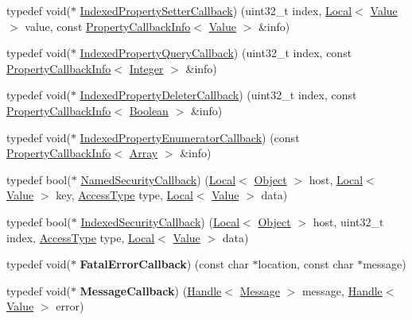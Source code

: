 \begin{DoxyCompactItemize}
\item 
typedef void($\ast$ \hyperlink{namespacev8_a4ac7cc6185ebc8b6a199f9fa8e6bf5c3}{Indexed\+Property\+Setter\+Callback}) (uint32\+\_\+t index, \hyperlink{classv8_1_1Local}{Local}$<$ \hyperlink{classv8_1_1Value}{Value} $>$ value, const \hyperlink{classv8_1_1PropertyCallbackInfo}{Property\+Callback\+Info}$<$ \hyperlink{classv8_1_1Value}{Value} $>$ \&info)
\item 
typedef void($\ast$ \hyperlink{namespacev8_a980b62c33eb664783e61e25c3b27f9ee}{Indexed\+Property\+Query\+Callback}) (uint32\+\_\+t index, const \hyperlink{classv8_1_1PropertyCallbackInfo}{Property\+Callback\+Info}$<$ \hyperlink{classv8_1_1Integer}{Integer} $>$ \&info)
\item 
typedef void($\ast$ \hyperlink{namespacev8_a53863728de14cde48dd6543207b2f2da}{Indexed\+Property\+Deleter\+Callback}) (uint32\+\_\+t index, const \hyperlink{classv8_1_1PropertyCallbackInfo}{Property\+Callback\+Info}$<$ \hyperlink{classv8_1_1Boolean}{Boolean} $>$ \&info)
\item 
typedef void($\ast$ \hyperlink{namespacev8_adbb0a6d5537371953f9ba807d4f6275e}{Indexed\+Property\+Enumerator\+Callback}) (const \hyperlink{classv8_1_1PropertyCallbackInfo}{Property\+Callback\+Info}$<$ \hyperlink{classv8_1_1Array}{Array} $>$ \&info)
\item 
typedef bool($\ast$ \hyperlink{namespacev8_ab5cafda0c556bba990c660ce9c904e0d}{Named\+Security\+Callback}) (\hyperlink{classv8_1_1Local}{Local}$<$ \hyperlink{classv8_1_1Object}{Object} $>$ host, \hyperlink{classv8_1_1Local}{Local}$<$ \hyperlink{classv8_1_1Value}{Value} $>$ key, \hyperlink{namespacev8_add8bef6469c5b94706584124e610046c}{Access\+Type} type, \hyperlink{classv8_1_1Local}{Local}$<$ \hyperlink{classv8_1_1Value}{Value} $>$ data)
\item 
typedef bool($\ast$ \hyperlink{namespacev8_aebbcc7837753e51112d944ad96520da1}{Indexed\+Security\+Callback}) (\hyperlink{classv8_1_1Local}{Local}$<$ \hyperlink{classv8_1_1Object}{Object} $>$ host, uint32\+\_\+t index, \hyperlink{namespacev8_add8bef6469c5b94706584124e610046c}{Access\+Type} type, \hyperlink{classv8_1_1Local}{Local}$<$ \hyperlink{classv8_1_1Value}{Value} $>$ data)
\item 
\hypertarget{namespacev8_abc93f69508701f18dc5cc0ce165616aa}{}typedef void($\ast$ {\bfseries Fatal\+Error\+Callback}) (const char $\ast$location, const char $\ast$message)\label{namespacev8_abc93f69508701f18dc5cc0ce165616aa}

\item 
\hypertarget{namespacev8_a26f4f3ae680876d9408a11d86f4e543d}{}typedef void($\ast$ {\bfseries Message\+Callback}) (\hyperlink{classv8_1_1Handle}{Handle}$<$ \hyperlink{classv8_1_1Message}{Message} $>$ message, \hyperlink{classv8_1_1Handle}{Handle}$<$ \hyperlink{classv8_1_1Value}{Value} $>$ error)\label{namespacev8_a26f4f3ae680876d9408a11d86f4e543d}


\end{DoxyCompactItemize}
